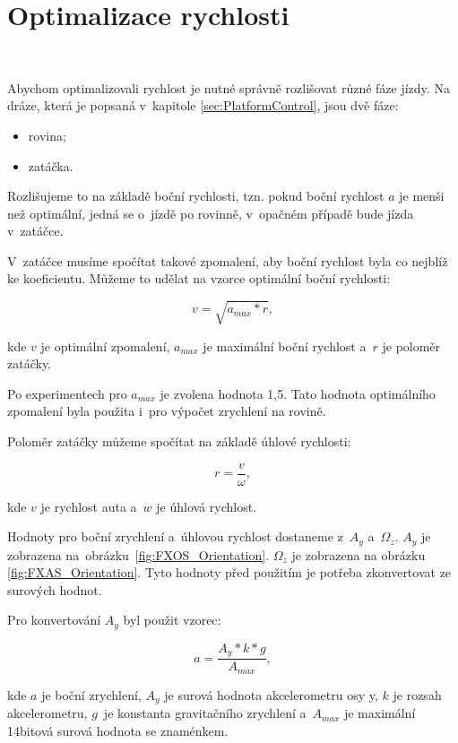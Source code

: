 \chapter{Optimalizace rychlosti}
\label{sec:SpeedOptimization}\

Abychom optimalizovali rychlost je nutné správně rozlišovat různé fáze jízdy. Na
dráze, která je popsaná v~kapitole \ref{sec:PlatformControl}, jsou dvě fáze:

\begin{itemize}
	\item{rovina;}
	\item{zatáčka.}
\end{itemize}

Rozlišujeme to na základě boční rychlosti, tzn. pokud boční rychlost $a$ je menši 
než optimální, jedná se o~jízdě po rovinně, v~opačném případě bude jízda v~zatáčce.

V~zatáčce musíme spočítat takové zpomalení, aby boční rychlost byla co nejblíž 
ke koeficientu. Můžeme to udělat na vzorce optimální boční rychlosti:

\begin{equation}
v = \sqrt{a_{max} * r},
\end{equation}

kde $v$ je optimální zpomalení, $a_{max}$ je maximální boční rychlost a~$r$ je 
poloměr zatáčky. 

Po experimentech pro $a_{max}$ je zvolena hodnota 1,5. Tato hodnota optimálního 
zpomalení byla použita i~pro výpočet zrychlení na rovině.

Poloměr zatáčky můžeme spočítat na základě úhlové rychlosti:

\begin{equation}
r = \frac{v}{\omega},
\end{equation}

kde $v$ je rychlost auta a~$w$ je úhlová rychlost.

Hodnoty pro boční zrychlení a~úhlovou rychlost dostaneme z~$A_y$ a~$\Omega_z$. 
$A_y$ je zobrazena na~obrázku~\ref{fig:FXOS_Orientation}.  $\Omega_z$ je zobrazena 
na obrázku \ref{fig:FXAS_Orientation}. Tyto hodnoty před použitím je potřeba 
zkonvertovat ze surových hodnot.

Pro konvertování $A_y$ byl použit vzorec:

\begin{equation}
a = \frac{A_y * k * g}{A_{max}},
\end{equation}

kde $a$ je boční zrychlení, $A_y$ je surová hodnota akcelerometru osy y,
$k$ je rozsah akcelerometru,  $g$~je konstanta gravitačního zrychlení a~$A_{max}$ 
je maximální 14bitová surová hodnota se znaménkem.

